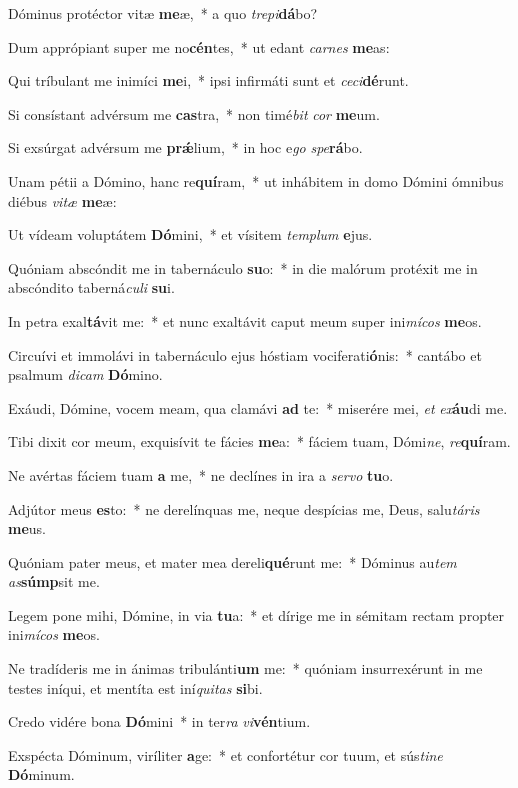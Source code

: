 \item Dóminus protéctor vitæ \textbf{me}æ,~* a quo \textit{tre}\textit{pi}\textbf{dá}bo?
\item Dum apprópiant super me no\textbf{cén}tes,~* ut edant \textit{car}\textit{nes} \textbf{me}as:
\item Qui tríbulant me inimíci \textbf{me}i,~* ipsi infirmáti sunt et \textit{ce}\textit{ci}\textbf{dé}runt.
\item Si consístant advérsum me \textbf{cas}tra,~* non timé\textit{bit} \textit{cor} \textbf{me}um.
\item Si exsúrgat advérsum me \textbf{prǽ}lium,~* in hoc e\textit{go} \textit{spe}\textbf{rá}bo.
\item Unam pétii a Dómino, hanc re\textbf{quí}ram,~* ut inhábitem in domo Dómini ómnibus diébus \textit{vi}\textit{tæ} \textbf{me}æ:
\item Ut vídeam voluptátem \textbf{Dó}mini,~* et vísitem \textit{tem}\textit{plum} \textbf{e}jus.
\item Quóniam abscóndit me in tabernáculo \textbf{su}o:~* in die malórum protéxit me in abscóndito taberná\textit{cu}\textit{li} \textbf{su}i.
\item In petra exal\textbf{tá}vit me:~* et nunc exaltávit caput meum super ini\textit{mí}\textit{cos} \textbf{me}os.
\item Circuívi et immolávi in tabernáculo ejus hóstiam vociferati\textbf{ó}nis:~* cantábo et psalmum \textit{di}\textit{cam} \textbf{Dó}mino.
\item Exáudi, Dómine, vocem meam, qua clamávi \textbf{ad} te:~* miserére mei, \textit{et} \textit{ex}\textbf{áu}di me.
\item Tibi dixit cor meum, exquisívit te fácies \textbf{me}a:~* fáciem tuam, Dómi\textit{ne}, \textit{re}\textbf{quí}ram.
\item Ne avértas fáciem tuam \textbf{a} me,~* ne declínes in ira a \textit{ser}\textit{vo} \textbf{tu}o.
\item Adjútor meus \textbf{es}to:~* ne derelínquas me, neque despícias me, Deus, salu\textit{tá}\textit{ris} \textbf{me}us.
\item Quóniam pater meus, et mater mea dereli\textbf{qué}runt me:~* Dóminus au\textit{tem} \textit{as}\textbf{súmp}sit me.
\item Legem pone mihi, Dómine, in via \textbf{tu}a:~* et dírige me in sémitam rectam propter ini\textit{mí}\textit{cos} \textbf{me}os.
\item Ne tradíderis me in ánimas tribulánti\textbf{um} me:~* quóniam insurrexérunt in me testes iníqui, et mentíta est iní\textit{qui}\textit{tas} \textbf{si}bi.
\item Credo vidére bona \textbf{Dó}mini~* in ter\textit{ra} \textit{vi}\textbf{vén}tium.
\item Exspécta Dóminum, viríliter \textbf{a}ge:~* et confortétur cor tuum, et sús\textit{ti}\textit{ne} \textbf{Dó}minum.
